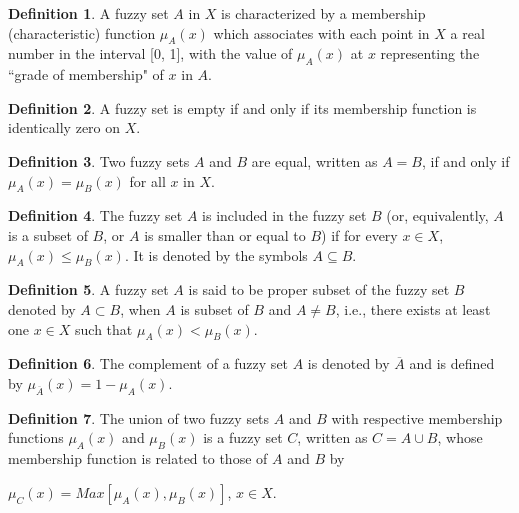 \documentclass{article}
\theoremstyle{definition}
\newtheorem{definition}{Definition}[section]
\begin{document}
\begin{definition}\cite{5}
A fuzzy set $A$ in $X$ is characterized by a membership (characteristic) function $\mu_A (x)$ which associates with each point in $X$ a real number in the interval [0, 1],  with the value of $\mu_A(x)$ at $x$ representing the ``grade of membership" of $x$ in $A$. \\
\end{definition}



\begin{definition}\cite{5}
   A fuzzy set is empty if and only if its membership function is identically zero on $X$.\\ 
\end{definition}

\begin{definition}\cite{5}
Two fuzzy sets $A$ and $B$ are equal, written as $A = B$, if and only if $\mu_A(x) = \mu_B(x)$ for all $x$ in $X$.\\
\end{definition}

\begin{definition}\cite{6}
    The fuzzy set $A$ is included in the fuzzy set $B$ (or, equivalently, $A$ is a subset of $B$, or $A$ is smaller than or equal to $B$) if for every $x\in X$, $\mu_A(x) \leq \mu_B(x)$. It is denoted by the  symbols $A\subseteq B$.\\
\end{definition}

\begin{definition}\cite{6}
     A fuzzy set $A$ is said to be proper subset of the fuzzy set $B$ denoted by $A\subset B$, when $A$ is subset of $B$ and $A \neq B$, i.e., there exists at least one $x\in X$ such that $\mu_A(x) < \mu_B(x)$.\\
\end{definition}

\begin{definition}\cite{6}
   The complement of a fuzzy set $A$ is denoted by $\overline{A}$ and is defined by $\mu_{\overline{A}}(x)=1-\mu_A(x)$.\\
\end{definition}


\begin{definition}\cite{5}
    The union of two fuzzy sets $A$ and $B$ with respective membership functions $\mu_A(x)$ and $\mu_B(x)$ is a fuzzy set $C$, written as $C=A\cup B$, whose membership function is related to those of $A$ and $B$ by 
\begin{center}
    $\mu_C(x) = Max[\mu_A(x), \mu_B(x)]$, $x\in X$.\\
\end{center}
\end{definition}
\end{document}
